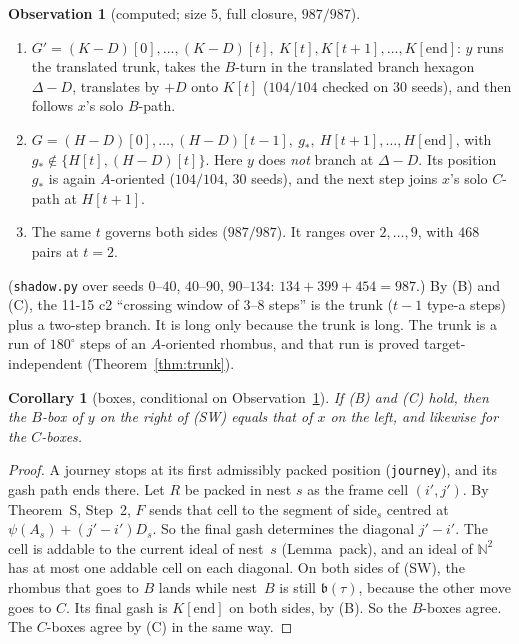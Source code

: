 \documentclass[11pt]{article}
\newtheorem{corollary}[theorem]{Corollary}
\theoremstyle{definition}\newtheorem{definition}[theorem]{Definition}\newtheorem{remark}[theorem]{Remark}
\newtheorem{observation}[theorem]{Observation}
\begin{document}
\begin{observation}[computed; size 5, full closure, $987/987$]\label{obs:anat}
\begin{enumerate}
\item[(B)] $G'=(K-D)[0],\dots,(K-D)[t],\ K[t],K[t+1],\dots,K[\mathrm{end}]$: $y$ runs the translated trunk, takes the $B$-turn in the
translated branch hexagon $\Delta-D$, translates by $+D$ onto $K[t]$ ($104/104$ checked on 30 seeds), and then follows $x$'s solo $B$-path.
\item[(C)] $G=(H-D)[0],\dots,(H-D)[t-1],\ g_*,\ H[t+1],\dots,H[\mathrm{end}]$, with $g_*\notin\{H[t],(H-D)[t]\}$. Here $y$ does
\emph{not} branch at $\Delta-D$. Its position $g_*$ is again $A$-oriented ($104/104$, 30 seeds), and the next step joins $x$'s solo $C$-path at $H[t+1]$.
\item[(T)] The same $t$ governs both sides ($987/987$). It ranges over $2,\dots,9$, with $468$ pairs at $t=2$.
\end{enumerate}
\end{observation}
\noindent (\texttt{shadow.py} over seeds $0$--$40$, $40$--$90$, $90$--$134$: $134+399+454=987$.) By (B) and (C), the 11-15 c2 ``crossing window of
$3$--$8$ steps'' is the trunk ($t-1$ type-a steps) plus a two-step branch. It is long only because the trunk is long. The trunk is a run of
$180^\circ$ steps of an $A$-oriented rhombus, and that run is proved target-independent (Theorem~\ref{thm:trunk}).

\begin{corollary}[boxes, conditional on Observation~\ref{obs:anat}]\label{cor:boxes}
If (B) and (C) hold, then the $B$-box of $y$ on the right of (SW) equals that of $x$ on the left, and likewise for the $C$-boxes.
\end{corollary}
\begin{proof}
A journey stops at its first admissibly packed position (\texttt{journey}), and its gash path ends there. Let $R$ be packed in nest $s$ as the frame cell
$(i',j')$. By Theorem~S, Step~2, $F$ sends that cell to the segment of $\mathrm{side}_s$ centred at $\psi(A_s)+(j'-i')D_s$. So the final gash
determines the diagonal $j'-i'$. The cell is addable to the current ideal of nest~$s$ (Lemma~pack), and an ideal of $\mathbb N^2$ has at most one
addable cell on each diagonal. On both sides of (SW), the rhombus that goes to $B$ lands while nest~$B$ is still $\mathfrak b(\tau)$, because the other
move goes to $C$. Its final gash is $K[\mathrm{end}]$ on both sides, by (B). So the $B$-boxes agree. The $C$-boxes agree by (C) in the same way.
\end{proof}
\end{document}
